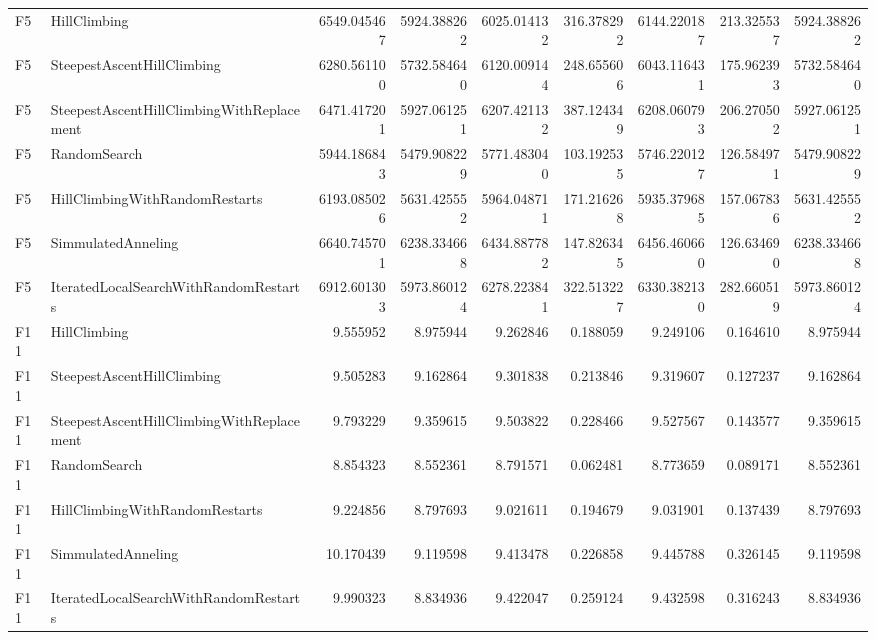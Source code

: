 \begin{tabular}{llrrrrrrr}
F5 & HillClimbing & 6549.045467 & 5924.388262 & 6025.014132 & 316.378292 & 6144.220187 & 213.325537 & 5924.388262 \\
F5 & SteepestAscentHillClimbing & 6280.561100 & 5732.584640 & 6120.009144 & 248.655606 & 6043.116431 & 175.962393 & 5732.584640 \\
F5 & SteepestAscentHillClimbingWithReplacement & 6471.417201 & 5927.061251 & 6207.421132 & 387.124349 & 6208.060793 & 206.270502 & 5927.061251 \\
F5 & RandomSearch & 5944.186843 & 5479.908229 & 5771.483040 & 103.192535 & 5746.220127 & 126.584971 & 5479.908229 \\
F5 & HillClimbingWithRandomRestarts & 6193.085026 & 5631.425552 & 5964.048711 & 171.216268 & 5935.379685 & 157.067836 & 5631.425552 \\
F5 & SimmulatedAnneling & 6640.745701 & 6238.334668 & 6434.887782 & 147.826345 & 6456.460660 & 126.634690 & 6238.334668 \\
F5 & IteratedLocalSearchWithRandomRestarts & 6912.601303 & 5973.860124 & 6278.223841 & 322.513227 & 6330.382130 & 282.660519 & 5973.860124 \\
F11 & HillClimbing & 9.555952 & 8.975944 & 9.262846 & 0.188059 & 9.249106 & 0.164610 & 8.975944 \\
F11 & SteepestAscentHillClimbing & 9.505283 & 9.162864 & 9.301838 & 0.213846 & 9.319607 & 0.127237 & 9.162864 \\
F11 & SteepestAscentHillClimbingWithReplacement & 9.793229 & 9.359615 & 9.503822 & 0.228466 & 9.527567 & 0.143577 & 9.359615 \\
F11 & RandomSearch & 8.854323 & 8.552361 & 8.791571 & 0.062481 & 8.773659 & 0.089171 & 8.552361 \\
F11 & HillClimbingWithRandomRestarts & 9.224856 & 8.797693 & 9.021611 & 0.194679 & 9.031901 & 0.137439 & 8.797693 \\
F11 & SimmulatedAnneling & 10.170439 & 9.119598 & 9.413478 & 0.226858 & 9.445788 & 0.326145 & 9.119598 \\
F11 & IteratedLocalSearchWithRandomRestarts & 9.990323 & 8.834936 & 9.422047 & 0.259124 & 9.432598 & 0.316243 & 8.834936 \\
\bottomrule
\end{tabular}
